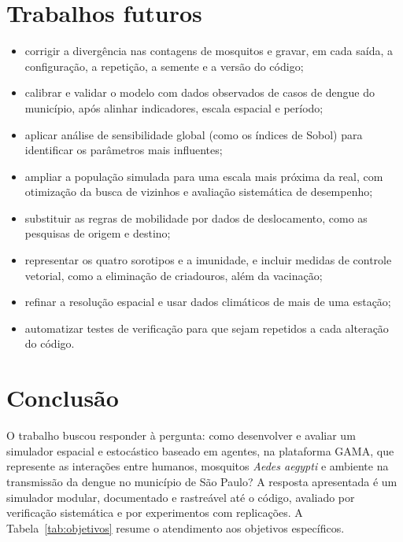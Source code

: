 \section{Trabalhos futuros}

\begin{itemize}
    \item corrigir a divergência nas contagens de mosquitos e gravar, em cada saída, a configuração, a repetição, a semente e a versão do código;
    \item calibrar e validar o modelo com dados observados de casos de dengue do município, após alinhar indicadores, escala espacial e período;
    \item aplicar análise de sensibilidade global (como os índices de Sobol) para identificar os parâmetros mais influentes;
    \item ampliar a população simulada para uma escala mais próxima da real, com otimização da busca de vizinhos e avaliação sistemática de desempenho;
    \item substituir as regras de mobilidade por dados de deslocamento, como as pesquisas de origem e destino;
    \item representar os quatro sorotipos e a imunidade, e incluir medidas de controle vetorial, como a eliminação de criadouros, além da vacinação;
    \item refinar a resolução espacial e usar dados climáticos de mais de uma estação;
    \item automatizar testes de verificação para que sejam repetidos a cada alteração do código.
\end{itemize}

\section{Conclusão}

O trabalho buscou responder à pergunta: como desenvolver e avaliar um simulador espacial e estocástico baseado em agentes, na plataforma GAMA, que represente as interações entre humanos, mosquitos \textit{Aedes aegypti} e ambiente na transmissão da dengue no município de São Paulo? A resposta apresentada é um simulador modular, documentado e rastreável até o código, avaliado por verificação sistemática e por experimentos com replicações. A Tabela~\ref{tab:objetivos} resume o atendimento aos objetivos específicos.

